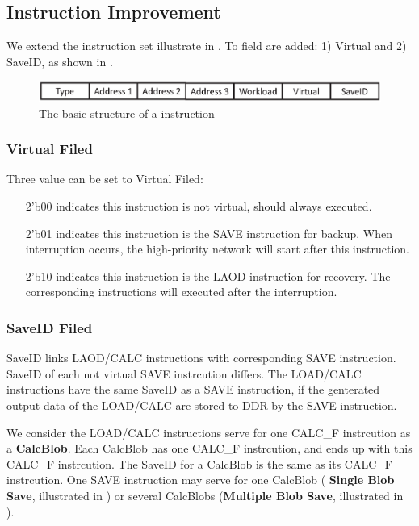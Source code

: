 \subsection{ Instruction Improvement }
\label{sec:virtualinstr}

We extend the instruction set illustrate in . To field are added: 1) Virtual and 2) SaveID, as shown in  .

\begin{figure}[h]
	\centering
	\includegraphics[width=0.9\linewidth]{fig/virtual_instr.eps}
	\caption{The basic structure of a instruction }
	\label{fig:virtual_instr}
\end{figure}

\subsubsection{ Virtual Filed}

Three value can be set to Virtual Filed:
\begin{itemize}
    \item[2'b00] indicates this instruction is not virtual, should always executed.
    \item[2'b01] indicates this instruction is the SAVE instruction for backup. When interruption occurs, the high-priority network will start after this instruction.
    \item[2'b10] indicates this instruction is the LAOD instruction for recovery. The corresponding instructions will executed after the interruption. 
\end{itemize}

\subsubsection{ SaveID Filed }

SaveID links LAOD/CALC instructions with corresponding SAVE instruction. SaveID of each not virtual SAVE instrcution differs. The LOAD/CALC instructions have the same SaveID as a SAVE instruction, if the genterated output data of the LOAD/CALC are stored to DDR by the SAVE instruction. 

We consider the LOAD/CALC instructions serve for one CALC\_F instrcution as a \textbf{CalcBlob}. Each CalcBlob has one CALC\_F instrcution, and ends up with this CALC\_F instrcution. The SaveID for a CalcBlob is the same as its CALC\_F instrcution.
One SAVE instruction may serve for one CalcBlob ( \textbf{Single Blob Save}, illustrated in  ) or several CalcBlobs (\textbf{Multiple Blob Save}, illustrated in ).

